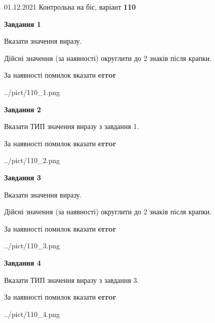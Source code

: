 \documentclass[11pt, ukrainian]{article}
\begin{document}
{01.12.2021 Контрольна на біс, варіант  \No \textbf { 110 }\par}
{
\begin {large}
{\begin {center}\textbf{Завдання 1}\end {center}}\par
Вказати значення виразу. \par
Дійсні значення (за наявності) округлити до 2 знаків після крапки. \par
За наявності помилок вказати \textbf{error}

\begin{center}
	{../pict/110_1.png}
\end{center}
\newpage

{\begin {center}\textbf{Завдання 2}\end {center}}\par
Вказати ТИП значення виразу з завдання 1. \par
За наявності помилок вказати \textbf{error}

\begin{center}
	{../pict/110_2.png}
\end{center}
\newpage

{\begin {center}\textbf{Завдання 3}\end {center}}\par
Вказати значення виразу. \par
Дійсні значення (за наявності) округлити до 2 знаків після крапки. \par
За наявності помилок вказати \textbf{error}

\begin{center}
	{../pict/110_3.png}
\end{center}
\newpage

{\begin {center}\textbf{Завдання 4}\end {center}}\par
Вказати ТИП значення виразу з завдання 3. \par
За наявності помилок вказати \textbf{error}

\begin{center}
	{../pict/110_4.png}
\end{center}
\newpage


\end{large}}
\end{document}

